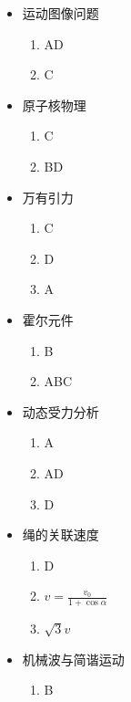 \documentclass{article}
\begin{document}
\begin{minipage}{0.5\textwidth}
    \begin{itemize}
        \item 运动图像问题
              \begin{enumerate}
                  \item AD
                  \item C
              \end{enumerate}
        \item 原子核物理
              \begin{enumerate}
                  \item C
                  \item BD
              \end{enumerate}
        \item 万有引力
              \begin{enumerate}
                  \item C
                  \item D
                  \item A
              \end{enumerate}
        \item 霍尔元件
              \begin{enumerate}
                  \item B
                  \item ABC
              \end{enumerate}
        \item 动态受力分析
              \begin{enumerate}
                  \item A
                  \item AD
                  \item D
              \end{enumerate}
        \item 绳的关联速度
              \begin{enumerate}
                  \item D
                  \item $v = \frac{v_{0}}{1+\cos{\alpha}}$
                  \item $\sqrt{3}v$
              \end{enumerate}
        \item 机械波与简谐运动
              \begin{enumerate}
                  \item B

\end{enumerate}
\end{itemize}
\end{minipage}
\end{document}
